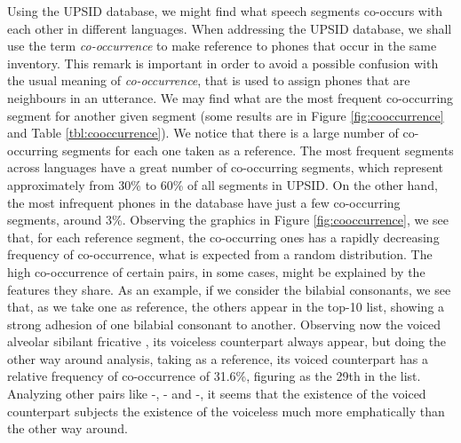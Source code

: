 Using the UPSID database, we might find what speech segments co-occurs with each other in
different languages. When addressing the UPSID database, we shall use the term \emph{co-occurrence}  
to make reference to phones that occur in the same inventory. This remark is important in order to avoid
a possible confusion with the usual meaning of \emph{co-occurrence}, that is used to
assign phones that are neighbours in an utterance.  
We may find what are the most frequent co-occurring segment for another given segment 
(some results are in Figure \ref{fig:cooccurrence} and Table \ref{tbl:cooccurrence}). 
We notice that there is a large number of co-occurring segments for each one taken as a reference. 
The most frequent segments across languages have a great number of co-occurring segments, 
which represent approximately from 30\% to 60\% of all segments in UPSID. On the other hand, 
the most infrequent phones in the database have just a few co-occurring segments, around 3\%. 
Observing the graphics in Figure \ref{fig:cooccurrence}, we see that, for each reference segment, 
the co-occurring ones has a rapidly decreasing frequency of co-occurrence, what is expected from a random distribution. 
The high co-occurrence of certain pairs, in some cases, might be explained by the features they share. 
As an example, if we consider the bilabial consonants, we see that, as we take one as reference, 
the others appear in the top-10 list, showing a strong adhesion of one bilabial consonant to another. 
Observing now the voiced alveolar sibilant fricative \textipa{[z]}, its voiceless counterpart always appear, 
but doing the other way around analysis, taking \textipa{[s]} as a reference, its voiced counterpart \textipa{[z]} 
has a relative frequency of co-occurrence of 31.6\%, figuring as the 29th in the list. 
Analyzing other pairs like \textipa{[t]}-\textipa{[d]}, \textipa{[k]}-\textipa{[g]} and \textipa{[p]}-\textipa{[b]}, 
it seems that the existence of the voiced counterpart subjects the existence of the voiceless much more 
emphatically than the other way around.


